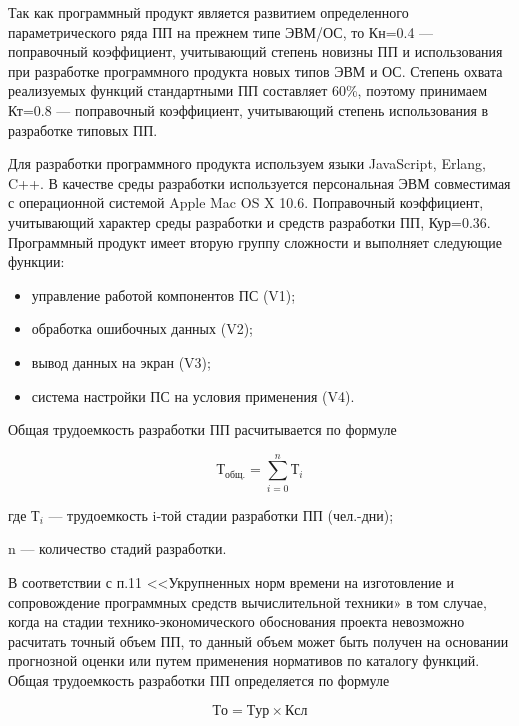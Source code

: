 Так как программный продукт является развитием определенного параметрического ряда ПП на прежнем типе ЭВМ/ОС,
то Кн=0.4 --- поправочный коэффициент, учитывающий степень новизны ПП и использования при разработке
программного продукта новых типов ЭВМ и ОС. Степень  охвата реализуемых функций стандартными ПП составляет 60\%, 
поэтому принимаем Кт=0.8 --- поправочный коэффициент, учитывающий степень 
использования в разработке типовых ПП.

Для разработки программного продукта используем языки JavaScript, Erlang, C++.
В качестве среды разработки используется персональная ЭВМ совместимая с операционной системой
Apple Mac OS X 10.6. Поправочный коэффициент, учитывающий характер среды разработки и средств
разработки ПП, Кур=0.36.
Программный продукт имеет вторую группу сложности и выполняет следующие функции:

\begin{itemize}
    \item{} управление работой компонентов ПС (V1);
    \item{} обработка ошибочных данных (V2);
    \item{} вывод данных на экран (V3);
    \item{} система настройки ПС на условия применения (V4).
\end{itemize}

Общая трудоемкость разработки ПП расчитывается по формуле

\begin{equation}
    Т_{общ.} = \sum_{i=0}^{n}Т_i
\end{equation}

\begin{ESKDexplanation}
    \item[где ]{} $Т_i$ --- трудоемкость i-той стадии разработки ПП (чел.-дни);
    \item{} n --- количество стадий разработки.
\end{ESKDexplanation}


В соответствии с п.11 <<Укрупненных норм времени на изготовление и сопровождение программных
средств вычислительной техники» в том случае, когда на стадии технико-экономического
обоснования проекта невозможно расчитать точный объем ПП, то данный объем может быть 
получен на основании прогнозной оценки или путем применения нормативов по каталогу функций.
Общая трудоемкость разработки ПП определяется по формуле

\begin{equation}
    То = Тур \times{} Ксл
\end{equation}

